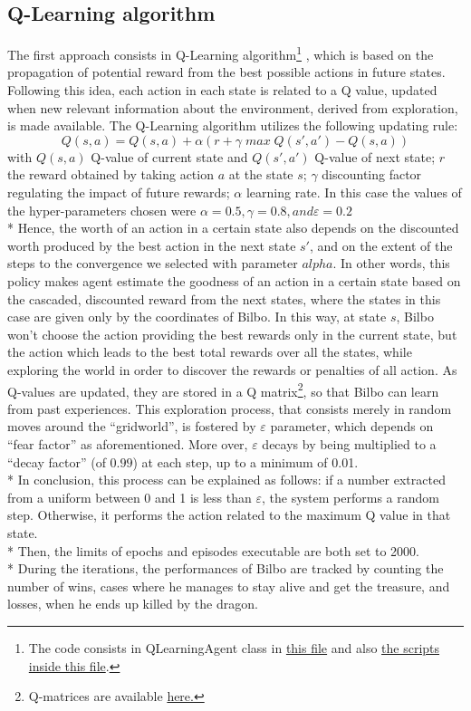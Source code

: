 \subsection{Q-Learning algorithm}
The first approach consists in Q-Learning algorithm\footnote{The code consists in QLearningAgent class in \href{https://github.com/moiraghif/DragonHunting/blob/master/Bilbo\%20World/agents.py}{this file} and also \href{https://github.com/moiraghif/DragonHunting/blob/master/Bilbo\%20World/Bilbo_q_learning.py}{the scripts inside this file}.} \cite{2}, which is based on the propagation of potential reward from the best possible actions in future states. Following this idea, each action in each state is related to a Q value, updated when new relevant information about the environment, derived from exploration, is made available. The Q-Learning algorithm utilizes the following updating rule:
$$Q(s,a)=Q(s,a)+\alpha(r+\gamma\;max\;Q(s',a') - Q(s,a))$$
with $Q(s,a)$ Q-value of current state and $Q(s',a')$ Q-value of next state; $r$ the reward obtained by taking action $a$ at the state $s$; $\gamma$ discounting factor regulating the impact of future rewards; $\alpha$ learning rate. In this case the values of the hyper-parameters chosen were $\alpha=0.5, \gamma=0.8, and \varepsilon=0.2$\\*
Hence, the worth of an action in a certain state also depends on the discounted worth produced by the best action in the next state $s'$, and on the extent of the steps to the convergence we selected with parameter $alpha$. In other words, this policy makes agent estimate the goodness of an action in a certain state based on the cascaded, discounted reward from the next states, where the states in this case are given only by the coordinates of Bilbo. 
In this way, at state $s$, Bilbo won't choose the action providing the best rewards only in the current state, but the action which leads to the best total rewards over all the states, while exploring the world in order to discover the rewards or penalties of all action. As Q-values are updated, they are stored in a Q matrix\footnote{Q-matrices are available \href{https://github.com/moiraghif/DragonHunting/tree/master/Bilbo\%20World/models}{here.}}, so that Bilbo can learn from past experiences. This exploration process, that consists merely in random moves around the ``gridworld'', is fostered by $\varepsilon$ parameter, which depends on ``fear factor'' as aforementioned. More over, $\varepsilon$ decays by being multiplied to a ``decay factor'' (of $0.99$) at each step, up to a minimum of 0.01.\\*
In conclusion, this process can be explained as follows: if a number extracted from a uniform between 0 and 1 is less than $\varepsilon$, the system performs a random step. Otherwise, it performs the action related to the maximum Q value in that state.\\* 
Then, the limits of epochs and episodes executable are both set to 2000.\\*
During the iterations, the performances of Bilbo are tracked by counting the number of wins, cases where he manages to stay alive and get the treasure, and losses, when he ends up killed by the dragon.

